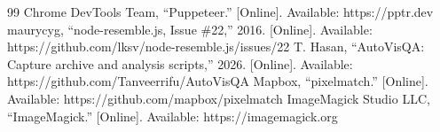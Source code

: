 \documentclass[conference]{IEEEtran}
\begin{document}
\begin{thebibliography}{99}
 Chrome DevTools Team, ``Puppeteer.'' [Online]. Available: https://pptr.dev
 maurycyg, ``node-resemble.js, Issue \#22,'' 2016. [Online]. Available: https://github.com/lksv/node-resemble.js/issues/22
 T. Hasan, ``AutoVisQA: Capture archive and analysis scripts,'' 2026. [Online]. Available: https://github.com/Tanveerrifu/AutoVisQA
 Mapbox, ``pixelmatch.'' [Online]. Available: https://github.com/mapbox/pixelmatch
 ImageMagick Studio LLC, ``ImageMagick.'' [Online]. Available: https://imagemagick.org
\end{thebibliography}
\end{document}
